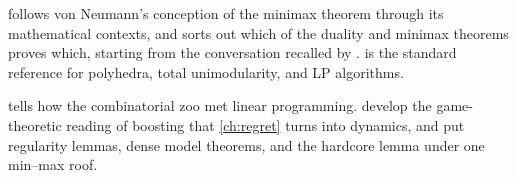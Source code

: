 \begin{refsection}
\notesandrefs

\Textcite{Kjeldsen2001} follows von Neumann's conception of the minimax theorem through its mathematical contexts, and \textcite{vonStengel2024} sorts out which of the duality and minimax theorems proves which, starting from the conversation recalled by \textcite{Dantzig1982}. \textcite{Schrijver1986} is the standard reference for polyhedra, total unimodularity, and LP algorithms.

\textcite{Schrijver2005} tells how the combinatorial zoo met linear programming. \textcite{FreundSchapire1996} develop the game-theoretic reading of boosting that \cref{ch:regret} turns into dynamics, and \textcite{TrevisanTulsianiVadhan2009} put regularity lemmas, dense model theorems, and the hardcore lemma under one min\nobreakdash--max roof.

\printchapterbib
\end{refsection}
